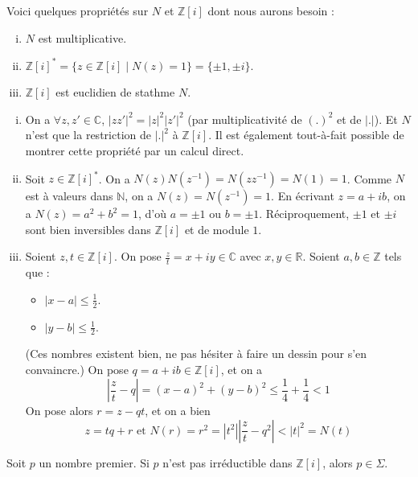 	\begin{lemma}
		\label{deux-carres-fermat-3}
		Voici quelques propriétés sur $N$ et $\mathbb{Z}[i]$ dont nous aurons besoin :
		\begin{enumerate}[(i)]
			\item $N$ est multiplicative.
			\item $\mathbb{Z}[i]^* = \{ z \in \mathbb{Z}[i] \mid N(z) = 1 \} = \{ \pm 1, \pm i \}$.
			\item $\mathbb{Z}[i]$ est euclidien de stathme $N$.
		\end{enumerate}
	\end{lemma}

	\begin{demonstration}
		\begin{enumerate}[(i)]
			\item On a $\forall z, z' \in \mathbb{C}$, $|zz'|^2 = |z|^2 |z'|^2$ (par multiplicativité de $(.)^2$ et de $|.|$). Et $N$ n'est que la restriction de $|.|^2$ à $\mathbb{Z}[i]$. Il est également tout-à-fait possible de montrer cette propriété par un calcul direct.
			\item Soit $z \in \mathbb{Z}[i]^*$. On a $N(z)N(z^{-1}) = N(zz^{-1}) = N(1) = 1$. Comme $N$ est à valeurs dans $\mathbb{N}$, on a $N(z) = N(z^{-1}) = 1$. En écrivant $z = a+ib$, on a $N(z) = a^2 + b^2 = 1$, d'où $a = \pm 1$ ou $b = \pm 1$. Réciproquement, $\pm 1$ et $\pm i$ sont bien inversibles dans $\mathbb{Z}[i]$ et de module $1$.
			\item Soient $z, t \in \mathbb{Z}[i]$. On pose $\frac{z}{t} = x + iy \in \mathbb{C}$ avec $x, y \in \mathbb{R}$. Soient $a, b \in \mathbb{Z}$ tels que :
			\begin{itemize}
				\item $|x-a| \leq \frac{1}{2}$.
				\item $|y-b| \leq \frac{1}{2}$.
			\end{itemize}
			(Ces nombres existent bien, ne pas hésiter à faire un dessin pour s'en convaincre.) On pose $q = a+ib \in \mathbb{Z}[i]$, et on a
			\[ \left| \frac{z}{t} - q \right| = (x-a)^2 + (y-b)^2 \leq \frac{1}{4} + \frac{1}{4} < 1 \]
			On pose alors $r = z-qt$, et on a bien
			\[ z = tq+r \text{ et } N(r) = r^2 = |t^2| \left| \frac{z}{t} - q^2 \right| < |t|^2 = N(t) \]
		\end{enumerate}
	\end{demonstration}

	\begin{lemma}
		\label{deux-carres-fermat-4}
		Soit $p$ un nombre premier. Si $p$ n'est pas irréductible dans $\mathbb{Z}[i]$, alors $p \in \Sigma$.
	\end{lemma}


